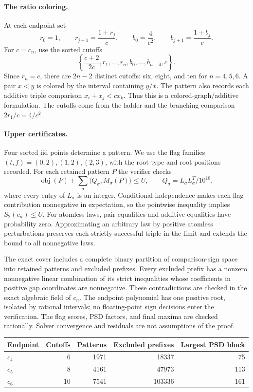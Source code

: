 \documentclass[11pt]{article}
\begin{document}
\paragraph{The ratio coloring.}
At each endpoint set
\[
r_0=1,\qquad r_{j+1}=\frac{1+r_j}{c},\qquad
b_0=\frac4{c^2},\qquad b_{j+1}=\frac{1+b_j}{c}.
\]
For $c=c_n$, use the sorted cutoffs
\[
\left\{\frac{c+2}{2c},r_1,\ldots,r_n,b_0,\ldots,b_{n-4},c\right\}.
\]
Since $r_n=c$, there are $2n-2$ distinct cutoffs: six, eight, and ten
for $n=4,5,6$. A pair $x<y$ is colored by the interval containing $y/x$.
The pattern also records each additive triple comparison $x_i+x_j<cx_k$.
Thus this is a colored-graph/additive formulation. The cutoffs come from
the ladder and the branching comparison $2r_1/c=4/c^2$.

\paragraph{Upper certificates.}
Four sorted iid points determine a pattern. We use the flag families
$(t,f)=(0,2),(1,2),(2,3)$, with the root type and root positions recorded.
For each retained pattern $P$ the verifier checks
\[
\operatorname{obj}(P)+\sum_\sigma
 \langle Q_\sigma,M_\sigma(P)\rangle\le U,
\qquad Q_\sigma=L_\sigma L_\sigma^T/10^{18},
\]
where every entry of $L_\sigma$ is an integer.
Conditional independence makes each flag contribution nonnegative in
expectation, so the pointwise inequality implies $S_2(c_n)\le U$.
For atomless laws, pair equalities and additive equalities have probability
zero. Approximating an arbitrary law by positive atomless perturbations
preserves each strictly successful triple in the limit and extends the
bound to all nonnegative laws.

The exact cover includes a complete binary partition of comparison-sign
space into retained patterns and excluded prefixes. Every excluded prefix
has a nonzero nonnegative linear combination of its strict inequalities
whose coefficients in positive gap coordinates are nonnegative.
These contradictions are checked in the exact algebraic field of $c_n$.
The endpoint polynomial has one positive root, isolated by rational
intervals; no floating-point sign decisions enter the verification.
The flag scores, PSD factors, and final maxima are checked rationally.
Solver convergence and residuals are not assumptions of the proof.
\begin{center}
\begin{tabular}{lrrrr}\toprule
Endpoint&Cutoffs&Patterns&Excluded prefixes&Largest PSD block\\\midrule
$c_4$&6&1971&18337&75\\
$c_5$&8&4161&47973&113\\
$c_6$&10&7541&103336&161\\
\bottomrule\end{tabular}
\end{center}
\end{document}
